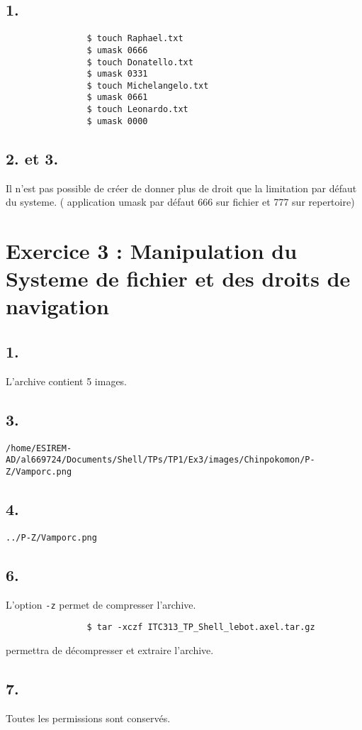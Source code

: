         \subsection{1.}
            \begin{verbatim}
                $ touch Raphael.txt
                $ umask 0666
                $ touch Donatello.txt
                $ umask 0331
                $ touch Michelangelo.txt
                $ umask 0661
                $ touch Leonardo.txt
                $ umask 0000
            \end{verbatim}
        \subsection{2. et 3.}
            Il n'est pas possible de créer de donner plus de droit que la limitation par défaut du systeme.
            ( application umask par défaut 666 sur fichier et 777 sur repertoire)
    \section{Exercice 3 : Manipulation du Systeme de fichier et des droits de navigation}
        \subsection{1.}
            L'archive contient 5 images.
        \subsection{3.}
            \texttt{/home/ESIREM-AD/al669724/Documents/Shell/TPs/TP1/Ex3/images/Chinpokomon/P-Z/Vamporc.png}
        \subsection{4.}
            \texttt{../P-Z/Vamporc.png}
        \subsection{6.}
            L'option \texttt{-z} permet de compresser l'archive.
            \begin{verbatim}
                $ tar -xczf ITC313_TP_Shell_lebot.axel.tar.gz
            \end{verbatim}
            permettra de décompresser et extraire l'archive.
        \subsection{7.}
            Toutes les permissions sont conservés.
